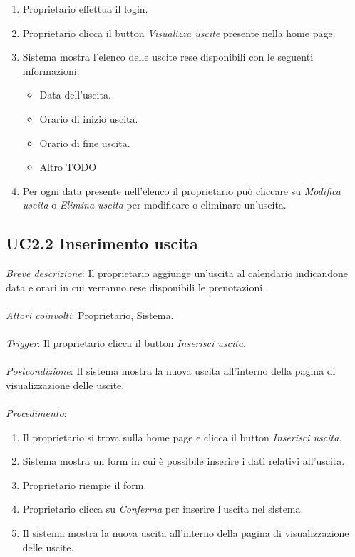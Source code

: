 \begin{enumerate}
    \item Proprietario effettua il login.
    \item Proprietario clicca il button \textit{Visualizza uscite} presente nella home page.
    \item Sistema mostra l'elenco delle uscite rese disponibili con le seguenti informazioni:
          \begin{itemize}
              \item Data dell'uscita.
              \item Orario di inizio uscita.
              \item Orario di fine uscita.
              \item Altro TODO
          \end{itemize}
    \item Per ogni data presente nell'elenco il proprietario può cliccare su \textit{Modifica uscita} o \textit{Elimina uscita} per modificare o eliminare un'uscita.
\end{enumerate}

\subsection{UC2.2 Inserimento uscita}

\emph{Breve descrizione}: Il proprietario aggiunge un'uscita al calendario indicandone data e orari in cui verranno rese disponibili le prenotazioni.\\\\
\emph{Attori coinvolti}: Proprietario, Sistema.\\\\
\emph{Trigger}: Il proprietario clicca il button \textit{Inserisci uscita}.\\\\
\emph{Postcondizione}: Il sistema mostra la nuova uscita all'interno della pagina di visualizzazione delle uscite.\\\\
\emph{Procedimento}:

\begin{enumerate}
    \item Il proprietario si trova sulla home page e clicca il button \textit{Inserisci uscita}.
    \item Sistema mostra un form in cui è possibile inserire i dati relativi all'uscita.
    \item Proprietario riempie il form.
    \item Proprietario clicca su \textit{Conferma} per inserire l'uscita nel sistema.
    \item Il sistema mostra la nuova uscita all'interno della pagina di visualizzazione delle uscite.
\end{enumerate}

